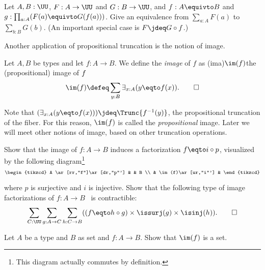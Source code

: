 \begin{xca}\label{xca:sum-equivalences}
Let $A,B:\UU$, $F:A\to\UU$ and $G:B\to\UU$,
and $f: A\equivto B$ and $g:\prod_{a:A}(F(a) \equivto G(f(a)))$.
Give an equivalence from $\sum_{a:A} F(a)$ to $\sum_{b:B} G(b)$.
(An important special case is $F\jdeq G\circ f$.)
\end{xca}

Another application of propositional truncation
is the notion of image.
\begin{definition}\label{def:prop-image}
  Let $A,B$ be types and let $f : A \to B$. We define the \emph{image} of $f$ as
  \glossary(ima){$\protect\im(f)$}{the (propositional) image of $\protect f$}
  \[
    \im(f) \defeq \sum_{y:B}\exists_{x:A}(y \eqto f(x)).\qedhere
  \]
\end{definition}

Note that $(\exists_{x:A}(y \eqto f(x))) \jdeq \Trunc{f^{-1}(y)}$,
the propositional truncation of the fiber.
For this reason, $\im(f)$ is called the \emph{propositional} image.
Later we will meet other notions of image, based on other truncation operations.

\begin{xca}\label{xca:unique-fact-image}
  Show that the image of $f : A \to B$ induces a factorization
  $f \eqto i\circ p$, visualized by the following diagram\footnote{%
  This diagram actually commutes by definition.}
  \[
    \begin{tikzcd}
      A \ar[rr,"f"]\ar[dr,"p"'] & & B \\
      & \im(f)\ar[ur,"i"'] &
    \end{tikzcd}
  \]

  where $p$ is surjective and $i$ is injective. Show that the
  following type of image factorizations of $f : A \to B$~
  is contractible:
  \[
  \sum_{C:\UU}\sum_{g:A\to C}\sum_{h: C\to B}
  ((f \eqto h\circ g) \times \issurj(g) \times \isinj(h)).\qedhere
  \]
\end{xca}

\begin{xca}\label{xca:prop-image-is-set}
Let $A$ be a type and $B$ as set and $f:A\to B$.
Show that $\im(f)$ is a set.
\end{xca}

